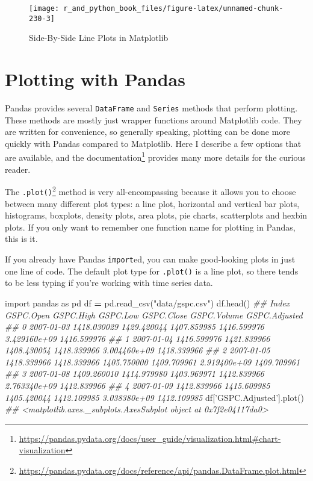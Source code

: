 \documentclass[12pt,krantz2]{krantz}
\makeatletter
\newenvironment{Shaded}{\begin{snugshade}}{\end{snugshade}}
\newcommand{\CommentTok}[1]{\textcolor[rgb]{0.37,0.37,0.37}{\textit{#1}}}
\newcommand{\ImportTok}[1]{#1}
\newcommand{\NormalTok}[1]{#1}
\newcommand{\OperatorTok}[1]{\textcolor[rgb]{0.43,0.43,0.43}{\textbf{#1}}}
\newcommand{\StringTok}[1]{\textcolor[rgb]{0.5,0.5,0.5}{#1}}
\renewcommand{\href}[2]{#2\footnote{\url{#1}}}
\newenvironment{kframe}{%
\medskip{}
\setlength{\fboxsep}{.8em}
 \def\at@end@of@kframe{}%
 \ifinner\ifhmode%
  \def\at@end@of@kframe{\end{minipage}}%
  \begin{minipage}{\columnwidth}%
 \fi\fi%
 \def\FrameCommand##1{\hskip\@totalleftmargin \hskip-\fboxsep
 \colorbox{shadecolor}{##1}\hskip-\fboxsep
     \hskip-\linewidth \hskip-\@totalleftmargin \hskip\columnwidth}%
 \MakeFramed {\advance\hsize-\width
   \@totalleftmargin\z@ \linewidth\hsize
   \@setminipage}}%
 {\par\unskip\endMakeFramed%
 \at@end@of@kframe}
\renewenvironment{Shaded}{\begin{kframe}}{\end{kframe}}
\makeatother
\begin{document}
\begin{figure}

{\centering \texttt{[image: r\_and\_python\_book\_files/figure-latex/unnamed-chunk-230-3]} 

}

\caption{Side-By-Side Line Plots in Matplotlib}\label{fig:unnamed-chunk-230}
\end{figure}

\hypertarget{plotting-with-pandas}{%
\section{Plotting with Pandas}\label{plotting-with-pandas}}

Pandas provides several \texttt{DataFrame} and \texttt{Series} methods that perform plotting. These methods are mostly just wrapper functions around Matplotlib code. They are written for convenience, so generally speaking, plotting can be done more quickly with Pandas compared to Matplotlib. Here I describe a few options that are available, and \href{https://pandas.pydata.org/docs/user_guide/visualization.html\#chart-visualization}{the documentation} provides many more details for the curious reader.

The \href{https://pandas.pydata.org/docs/reference/api/pandas.DataFrame.plot.html}{\texttt{.plot()}} method is very all-encompassing because it allows you to choose between many different plot types: a line plot, horizontal and vertical bar plots, histograms, boxplots, density plots, area plots, pie charts, scatterplots and hexbin plots. If you only want to remember one function name for plotting in Pandas, this is it.

If you already have Pandas \texttt{import}ed, you can make good-looking plots in just one line of code. The default plot type for \texttt{.plot()} is a line plot, so there tends to be less typing if you're working with time series data.

\begin{Shaded}
\begin{Highlighting}[]
\ImportTok{import}\NormalTok{ pandas }\ImportTok{as}\NormalTok{ pd}
\NormalTok{df }\OperatorTok{=}\NormalTok{ pd.read_csv(}\StringTok{"data/gspc.csv"}\NormalTok{)}
\NormalTok{df.head()}
\CommentTok{##         Index    GSPC.Open    GSPC.High     GSPC.Low   GSPC.Close   GSPC.Volume  GSPC.Adjusted}
\CommentTok{## 0  2007-01-03  1418.030029  1429.420044  1407.859985  1416.599976  3.429160e+09    1416.599976}
\CommentTok{## 1  2007-01-04  1416.599976  1421.839966  1408.430054  1418.339966  3.004460e+09    1418.339966}
\CommentTok{## 2  2007-01-05  1418.339966  1418.339966  1405.750000  1409.709961  2.919400e+09    1409.709961}
\CommentTok{## 3  2007-01-08  1409.260010  1414.979980  1403.969971  1412.839966  2.763340e+09    1412.839966}
\CommentTok{## 4  2007-01-09  1412.839966  1415.609985  1405.420044  1412.109985  3.038380e+09    1412.109985}
\NormalTok{df[}\StringTok{'GSPC.Adjusted'}\NormalTok{].plot()}
\CommentTok{## <matplotlib.axes._subplots.AxesSubplot object at 0x7f2e04117da0>}
\end{Highlighting}
\end{Shaded}
\end{document}
